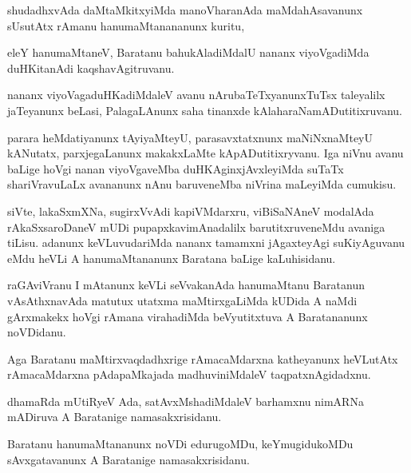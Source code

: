 \documentclass{article}
\begin{document}
\begin{mn}%
shudadhxvAda daMtaMkitxyiMda manoVharanAda maMdahAsavanunx sUsutAtx rAmanu hanumaMtanananunx 
kuritu,
\end{mn}

\begin{mn}%
eleY hanumaMtaneV, Baratanu bahukAladiMdalU nananx viyoVgadiMda duHKitanAdi kaqshavAgitruvanu.
\end{mn}

\begin{mn}%
nananx viyoVagaduHKadiMdaleV avanu nArubaTeTxyanunxTuTsx taleyalilx jaTeyanunx beLasi, 
PalagaLAnunx saha tinanxde kAlaharaNamADutitixruvanu.
\end{mn}

\begin{mn}%
parara heMdatiyanunx tAyiyaMteyU, parasavxtatxnunx maNiNxnaMteyU kANutatx, parxjegaLanunx 
makakxLaMte kApADutitixryvanu. Iga niVnu avanu baLige hoVgi nanan viyoVgaveMba 
duHKAginxjAvxleyiMda suTaTx shariVravuLaLx avananunx nAnu baruveneMba niVrina maLeyiMda 
cumukisu.
\end{mn}

\begin{mn}%
siVte, lakaSxmXNa, sugirxVvAdi kapiVMdarxru, viBiSaNAneV modalAda rAkaSxsaroDaneV mUDi 
pupapxkavimAnadalilx barutitxruveneMdu avaniga tiLisu. adanunx keVLuvudariMda nananx 
tamamxni jAgaxteyAgi suKiyAguvanu eMdu heVLi A hanumaMtananunx Baratana baLige kaLuhisidanu.
\end{mn}

\begin{mn}%
raGAviVranu I mAtanunx keVLi seVvakanAda hanumaMtanu Baratanun vAsAthxnavAda matutux 
utatxma maMtirxgaLiMda kUDida A naMdi gArxmakekx hoVgi rAmana virahadiMda beVyutitxtuva A 
Baratananunx noVDidanu.
\end{mn}

\begin{mn}%
Aga Baratanu maMtirxvaqdadhxrige rAmacaMdarxna katheyanunx heVLutAtx rAmacaMdarxna 
pAdapaMkajada madhuviniMdaleV taqpatxnAgidadxnu.
\end{mn}

\begin{mn}%
dhamaRda mUtiRyeV Ada, satAvxMshadiMdaleV barhamxnu nimARNa mADiruva A Baratanige 
namasakxrisidanu.
\end{mn}

\begin{mn}%
Baratanu hanumaMtananunx noVDi edurugoMDu, keYmugidukoMDu sAvxgatavanunx A Baratanige 
namasakxrisidanu.
\end{mn}
\end{document}
